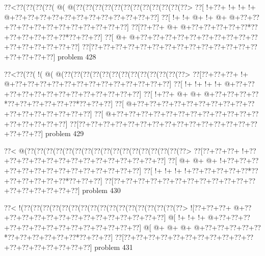 \vbox{\vbox{\goo
\0??<\0??(\0??(\0??(\0??(\- @(\- @(\0??(\0??(\0??(\0??(\0??(\0??(\0??(\0??(\0??(\0??(\0??(\0??>
\0??[\- !+\0??+\- !+\- !+\- !+\- @+\0??+\0??+\0??+\0??+\0??+\0??+\0??+\0??+\0??+\0??+\0??+\0??]
\0??[\- !+\- !+\- @+\- !+\- @+\- @+\0??+\0??+\0??+\0??+\0??+\0??+\0??+\0??+\0??+\0??+\0??+\0??]
\0??[\0??+\0??+\- @+\- @+\0??+\0??+\0??+\0??+\0??*\0??+\0??+\0??+\0??+\0??+\0??*\0??+\0??+\0??]
\0??[\- @+\- @+\0??+\0??+\0??+\0??+\0??+\0??+\0??+\0??+\0??+\0??+\0??+\0??+\0??+\0??+\0??+\0??]
\0??[\0??+\0??+\0??+\0??+\0??+\0??+\0??+\0??+\0??+\0??+\0??+\0??+\0??+\0??+\0??+\0??+\0??+\0??]
}
\hfil problem 428\hfil\break
}



\vbox{\vbox{\goo
\0??<\0??(\0??(\- !(\- @(\- @(\0??(\0??(\0??(\0??(\0??(\0??(\0??(\0??(\0??(\0??(\0??(\0??(\0??>
\0??[\0??+\0??+\0??+\- !+\- @+\0??+\0??+\0??+\0??+\0??+\0??+\0??+\0??+\0??+\0??+\0??+\0??+\0??]
\0??[\- !+\- !+\- !+\- !+\- @+\0??+\0??+\0??+\0??+\0??+\0??+\0??+\0??+\0??+\0??+\0??+\0??+\0??]
\0??[\- !+\0??+\- @+\- @+\- @+\0??+\0??+\0??+\0??*\0??+\0??+\0??+\0??+\0??+\0??*\0??+\0??+\0??]
\0??[\- @+\0??+\0??+\0??+\0??+\0??+\0??+\0??+\0??+\0??+\0??+\0??+\0??+\0??+\0??+\0??+\0??+\0??]
\0??[\- @+\0??+\0??+\0??+\0??+\0??+\0??+\0??+\0??+\0??+\0??+\0??+\0??+\0??+\0??+\0??+\0??+\0??]
\0??[\0??+\0??+\0??+\0??+\0??+\0??+\0??+\0??+\0??+\0??+\0??+\0??+\0??+\0??+\0??+\0??+\0??+\0??]
}
\hfil problem 429\hfil\break
}



\vbox{\vbox{\goo
\0??<\- @(\0??(\0??(\0??(\0??(\0??(\0??(\0??(\0??(\0??(\0??(\0??(\0??(\0??(\0??(\0??(\0??(\0??>
\0??[\0??+\0??+\0??+\- !+\0??+\0??+\0??+\0??+\0??+\0??+\0??+\0??+\0??+\0??+\0??+\0??+\0??+\0??]
\0??[\- @+\- @+\- @+\- !+\0??+\0??+\0??+\0??+\0??+\0??+\0??+\0??+\0??+\0??+\0??+\0??+\0??+\0??]
\0??[\- !+\- !+\- !+\- !+\0??+\0??+\0??+\0??+\0??*\0??+\0??+\0??+\0??+\0??+\0??*\0??+\0??+\0??]
\0??[\0??+\0??+\0??+\0??+\0??+\0??+\0??+\0??+\0??+\0??+\0??+\0??+\0??+\0??+\0??+\0??+\0??+\0??]
}
\hfil problem 430\hfil\break
}



\vbox{\vbox{\goo
\0??<\- !(\0??(\0??(\0??(\0??(\0??(\0??(\0??(\0??(\0??(\0??(\0??(\0??(\0??(\0??(\0??(\0??(\0??>
\- ![\0??+\0??+\0??+\- @+\0??+\0??+\0??+\0??+\0??+\0??+\0??+\0??+\0??+\0??+\0??+\0??+\0??+\0??]
\- @[\- !+\- !+\- !+\- @+\0??+\0??+\0??+\0??+\0??+\0??+\0??+\0??+\0??+\0??+\0??+\0??+\0??+\0??]
\- @[\- @+\- @+\- @+\- @+\0??+\0??+\0??+\0??+\0??*\0??+\0??+\0??+\0??+\0??+\0??*\0??+\0??+\0??]
\0??[\0??+\0??+\0??+\0??+\0??+\0??+\0??+\0??+\0??+\0??+\0??+\0??+\0??+\0??+\0??+\0??+\0??+\0??]
}
\hfil problem 431\hfil\break
}



